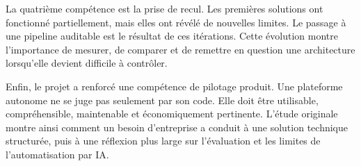 La quatrième compétence est la prise de recul. Les premières solutions ont fonctionné
partiellement, mais elles ont révélé de nouvelles limites. Le passage à une pipeline
auditable est le résultat de ces itérations. Cette évolution montre l'importance de mesurer,
de comparer et de remettre en question une architecture lorsqu'elle devient difficile à
contrôler.

Enfin, le projet a renforcé une compétence de pilotage produit. Une plateforme autonome
ne se juge pas seulement par son code. Elle doit être utilisable, compréhensible, maintenable
et économiquement pertinente. L'étude originale montre ainsi comment un besoin
d'entreprise a conduit à une solution technique structurée, puis à une réflexion plus large
sur l'évaluation et les limites de l'automatisation par IA.

